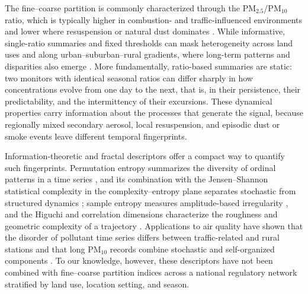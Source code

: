 \documentclass[a4paper,fleqn]{cas-sc}
\begin{document}
The fine--coarse partition is commonly characterized through the PM$_{2.5}$/PM$_{10}$ ratio, which is typically higher in combustion- and traffic-influenced environments and lower where resuspension or natural dust dominates \citep{Fan2021, Colangeli2022}. While informative, single-ratio summaries and fixed thresholds can mask heterogeneity across land uses and along urban--suburban--rural gradients, where long-term patterns and disparities also emerge \citep{Kilpatrick2024, Liu2023, Jbaily2022}. More fundamentally, ratio-based summaries are static: two monitors with identical seasonal ratios can differ sharply in how concentrations evolve from one day to the next, that is, in their persistence, their predictability, and the intermittency of their excursions. These dynamical properties carry information about the processes that generate the signal, because regionally mixed secondary aerosol, local resuspension, and episodic dust or smoke events leave different temporal fingerprints.

Information-theoretic and fractal descriptors offer a compact way to quantify such fingerprints. Permutation entropy summarizes the diversity of ordinal patterns in a time series \citep{Bandt2002}, and its combination with the Jensen--Shannon statistical complexity in the complexity--entropy plane separates stochastic from structured dynamics \citep{Lamberti2004, Rosso2007, Martin2006}; sample entropy measures amplitude-based irregularity \citep{Richman2000}, and the Higuchi and correlation dimensions characterize the roughness and geometric complexity of a trajectory \citep{Higuchi1988, Grassberger1983}. Applications to air quality have shown that the disorder of pollutant time series differs between traffic-related and rural stations \citep{Amato2020} and that long PM$_{10}$ records combine stochastic and self-organized components \citep{Nikolopoulos2021}. To our knowledge, however, these descriptors have not been combined with fine--coarse partition indices across a national regulatory network stratified by land use, location setting, and season.
\end{document}

